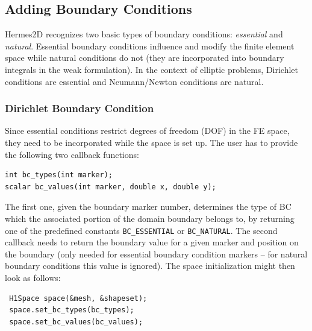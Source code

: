 \documentclass[11pt]{article}
\begin{document}

\subsection{Adding Boundary Conditions}
\label{sec:bc}

Hermes2D recognizes two basic types of boundary conditions: {\em essential} and {\em natural}.
Essential boundary conditions influence and modify the finite element space while natural
conditions do not (they are incorporated into boundary integrals in the weak formulation).
In the context of elliptic problems, Dirichlet conditions are essential and Neumann/Newton
conditions are natural.


\subsubsection{Dirichlet Boundary Condition}

Since essential conditions restrict degrees of freedom (DOF) in the FE space, 
they need to be incorporated while the space is set up.
The user has to provide the following two callback functions:

\begin{lstlisting}
int bc_types(int marker);
scalar bc_values(int marker, double x, double y);
\end{lstlisting}

The first one, given the boundary marker number, determines the type of BC which the associated
portion of the domain boundary belongs to, by returning one of the predefined constants 
\verb"BC_ESSENTIAL"
or \verb"BC_NATURAL". The second callback needs to return the boundary value for a given marker
and position on the boundary (only needed for essential boundary condition markers -- for natural
boundary conditions this value is ignored).
The space initialization might then look as follows:

\begin{lstlisting}
 H1Space space(&mesh, &shapeset);
 space.set_bc_types(bc_types);
 space.set_bc_values(bc_values);
\end{lstlisting}
\end{document}
